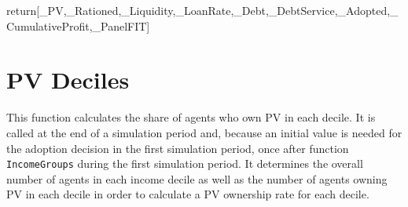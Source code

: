 \documentclass[
  letterpaper,
  DIV=11,
  numbers=noendperiod]{scrartcl}
\newenvironment{Shaded}{\begin{snugshade}}{\end{snugshade}}
\newcommand{\ControlFlowTok}[1]{\textcolor[rgb]{0.00,0.23,0.31}{#1}}
\newcommand{\NormalTok}[1]{\textcolor[rgb]{0.00,0.23,0.31}{#1}}
\begin{document}
\begin{Shaded}
\begin{Highlighting}[]
    \ControlFlowTok{return}\NormalTok{[\_PV,\_Rationed,\_Liquidity,\_LoanRate,\_Debt,\_DebtService,\_Adopted,\_CumulativeProfit,\_PanelFIT]}
\end{Highlighting}
\end{Shaded}

\hypertarget{pv-deciles}{%
\section{PV Deciles}\label{pv-deciles}}

This function calculates the share of agents who own PV in each decile.
It is called at the end of a simulation period and, because an initial
value is needed for the adoption decision in the first simulation
period, once after function \texttt{IncomeGroups} during the first
simulation period. It determines the overall number of agents in each
income decile as well as the number of agents owning PV in each decile
in order to calculate a PV ownership rate for each decile.
\end{document}
